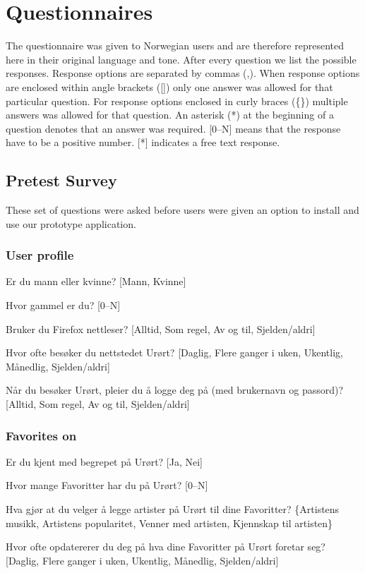 \chapter{Questionnaires}
\label{appendix:questionnaire}

The questionnaire was given to Norwegian users and are therefore represented
here in their original language and tone. After every question we list the
possible responses. Response options are separated by commas (,). When response
options are enclosed within angle brackets ([]) only one answer was allowed
for that particular question. For response options enclosed in curly braces
(\{\}) multiple answers was allowed for that question. An asterisk (*) at the
beginning of a question denotes that an answer was required. [0--N] means that
the response have to be a positive number. [*] indicates a free text response.

\section{Pretest Survey}

These set of questions were asked before users were given an option to install
and use our prototype application.

\subsection{User profile}

\begin{enum}
  \item Er du mann eller kvinne?
    [Mann, Kvinne]
  \item Hvor gammel er du?
    [0--N]
  \item * Bruker du Firefox nettleser?
    [Alltid, Som regel, Av og til, Sjelden/aldri]
  \item * Hvor ofte besøker du nettstedet Urørt?
    [Daglig, Flere ganger i uken, Ukentlig, Månedlig, Sjelden/aldri]
  \item * Når du besøker Urørt, pleier du å logge deg på (med brukernavn
    og passord)?
    [Alltid, Som regel, Av og til, Sjelden/aldri]
\end{enum}

\subsection{Favorites on \urort{}}

\begin{enum}
  \item * Er du kjent med begrepet  på Urørt?
    [Ja, Nei]
  \item Hvor mange Favoritter har du på Urørt?
    [0--N]
  \item Hva gjør at du velger å legge artister på Urørt til dine Favoritter?
    \{Artistens musikk, Artistens popularitet, Venner med artisten,
    Kjennskap til artisten\}
  \item  Hvor ofte opdatererer du deg på hva dine Favoritter på Urørt
    foretar seg?
    [Daglig, Flere ganger i uken, Ukentlig, Månedlig, Sjelden/aldri]
\end{enum}


